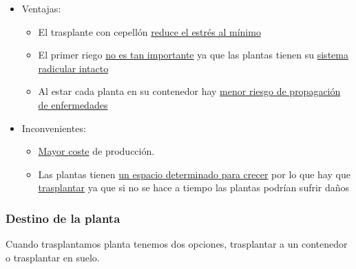 \documentclass[a4paper,12pt,oneside]{article}
\begin{document}
\begin{enumerate}
\begin{itemize}
\item Ventajas:\\
\begin{itemize}
\item El trasplante con cepellón \uline{reduce el estrés al mínimo}
\item El primer riego \uline{no es tan importante} ya que las plantas tienen su
\uline{sistema radicular intacto}
\item Al estar cada planta en su contenedor hay \uline{menor riesgo de propagación de
enfermedades}
\end{itemize}
\item Inconvenientes:\\
\begin{itemize}
\item \uline{Mayor coste} de producción.
\item Las plantas tienen \uline{un espacio determinado para crecer} por lo que hay que
\uline{trasplantar} ya que si no se hace a tiempo las plantas podrían sufrir
daños
\end{itemize}
\end{itemize}
\end{enumerate}

\subsubsection{Destino de la planta}
\label{sec:orgf00a0f8}
Cuando trasplantamos planta tenemos dos opciones, trasplantar a un contenedor
o trasplantar en suelo. 
\end{document}
